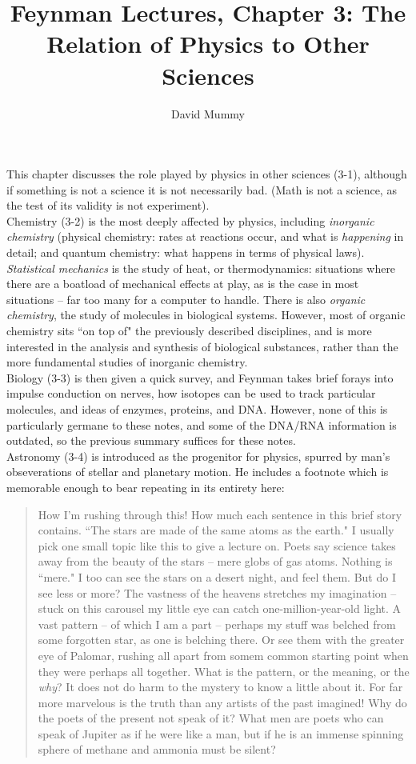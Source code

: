 \documentclass[10pt,letterpaper]{article}
\author{David Mummy}
\title{Feynman Lectures, Chapter 3: The Relation of Physics to Other Sciences}
\begin{document}
\maketitle
\indent This chapter discusses the role played by physics in other sciences (3-1), although if something is not a science it is not necessarily bad. (Math is not a science, as the test of its validity is not experiment). \\
\indent Chemistry (3-2) is the most deeply affected by physics, including \textit{inorganic chemistry} (physical chemistry: rates at reactions occur, and what is \textit{happening} in detail; and quantum chemistry: what happens in terms of physical laws). \textit{Statistical mechanics} is the study of heat, or thermodynamics: situations where there are a boatload of mechanical effects at play, as is the case in most situations -- far too many for a computer to handle. There is also \textit{organic chemistry}, the study of molecules in biological systems. However, most of organic chemistry sits ``on top of" the previously described disciplines, and is more interested in the analysis and synthesis of biological substances, rather than the more fundamental studies of inorganic chemistry. \\
\indent Biology (3-3) is then given a quick survey, and Feynman takes brief forays into impulse conduction on nerves, how isotopes can be used to track particular molecules, and ideas of enzymes, proteins, and DNA. However, none of this is particularly germane to these notes, and some of the DNA/RNA information is outdated, so the previous summary suffices for these notes. \\
\indent Astronomy (3-4) is introduced as the progenitor for physics, spurred by man's obseverations of stellar and planetary motion. He includes a footnote which is memorable enough to bear repeating in its entirety here:
\begin{quote}
How I'm rushing through this! How much each sentence in this brief story contains. ``The stars are made of the same atoms as the earth." I usually pick one small topic like this to give a lecture on. Poets say science takes away from the beauty of the stars -- mere globs of gas atoms. Nothing is ``mere." I too can see the stars on a desert night, and feel them. But do I see less or more? The vastness of the heavens stretches my imagination -- stuck on this carousel my little eye can catch one-million-year-old light. A vast pattern -- of which I am a part -- perhaps my stuff was belched from some forgotten star, as one is belching there. Or see them with the greater eye of Palomar, rushing all apart from somem common starting point when they were perhaps all together. What is the pattern, or the meaning, or the \textit{why}? It does not do harm to the mystery to know a little about it. For far more marvelous is the truth than any artists of the past imagined! Why do the poets of the present not speak of it? What men are poets who can speak of Jupiter as if he were like a man, but if he is an immense spinning sphere of methane and ammonia must be silent? 
\end{quote}
\end{document}
